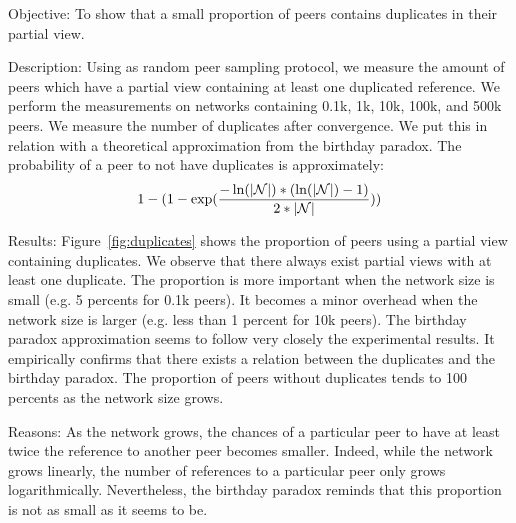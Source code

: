 \begin{asparadesc} 
\item[Objective:] To show that a small proportion of peers contains duplicates
  in their partial view.
\item[Description:] Using \SPRAY as random peer sampling protocol, we measure
  the amount of peers which have a partial view containing at least one
  duplicated reference. We perform the measurements on networks containing
  0.1k, 1k, 10k, 100k, and 500k peers. We measure the number of duplicates
  after convergence. We put this in relation with a theoretical approximation
  from the birthday paradox. The probability of a peer to not have duplicates
  is approximately:
  \begin{equation}
    1- 
    (1-
    \exp({-\ln(|\mathcal{N}|)*(\ln(|\mathcal{N}|)-1)\over{2*|\mathcal{N}|}}))
  \end{equation}
\item[Results:] Figure~\ref{fig:duplicates} shows the proportion of peers using
  a partial view containing duplicates. We observe that there always exist
  partial views with at least one duplicate. The proportion is more important
  when the network size is small (e.g. 5 percents for 0.1k peers). It becomes a
  minor overhead when the network size is larger (e.g. less than 1 percent for
  10k peers). The birthday paradox approximation seems to follow very closely
  the experimental results. It empirically confirms that there exists a relation
  between the duplicates and the birthday paradox. The proportion of peers
  without duplicates tends to 100 percents as the network size grows.
\item[Reasons:] As the network grows, the chances of a particular peer to have
  at least twice the reference to another peer becomes smaller. Indeed, while
  the network grows linearly, the number of references to a particular peer
  only grows logarithmically. Nevertheless, the birthday paradox reminds that
  this proportion is not as small as it seems to be.
\end{asparadesc}


